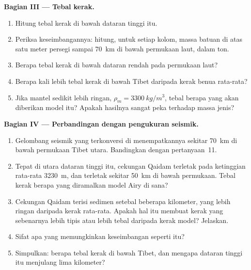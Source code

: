 \begin{problem}
\medskip
\noindent\textbf{Bagian III --- Tebal kerak.}
\begin{enumerate}[resume]
  \item Hitung tebal kerak di bawah dataran tinggi itu.
  \item Periksa keseimbangannya: hitung, untuk setiap kolom, massa batuan di
        atas satu meter persegi sampai \qty{70}{km} di bawah permukaan laut,
        dalam ton.
  \item Berapa tebal kerak di bawah dataran rendah pada permukaan laut?
  \item Berapa kali lebih tebal kerak di bawah Tibet daripada kerak benua
        rata-rata?
  \item Jika mantel sedikit lebih ringan, $\rho_m = \qty{3300}{kg/m^3}$,
        tebal berapa yang akan diberikan model itu? Apakah hasilnya sangat
        peka terhadap massa jenis?
\end{enumerate}

\medskip
\noindent\textbf{Bagian IV --- Perbandingan dengan pengukuran seismik.}
\begin{enumerate}[resume]
  \item Gelombang seismik yang terkonversi di  menempatkannya sekitar
        \qty{70}{km} di bawah permukaan Tibet utara. Bandingkan dengan pertanyaan~11.
  \item Tepat di utara dataran tinggi itu, cekungan Qaidam terletak pada
        ketinggian rata-rata \qty{3230}{m}, dan  terletak sekitar
        \qty{50}{km} di bawah permukaan. Tebal kerak berapa yang diramalkan
        model Airy di sana?
  \item Cekungan Qaidam terisi sedimen setebal beberapa kilometer, yang lebih
        ringan daripada kerak rata-rata. Apakah hal itu membuat kerak yang
        sebenarnya lebih tipis atau lebih tebal daripada kerak model? Jelaskan.
  \item Sifat  apa yang memungkinkan keseimbangan seperti itu?
  \item Simpulkan: berapa tebal kerak di bawah Tibet, dan mengapa dataran tinggi
        itu menjulang lima kilometer?
\end{enumerate}
\end{problem}
